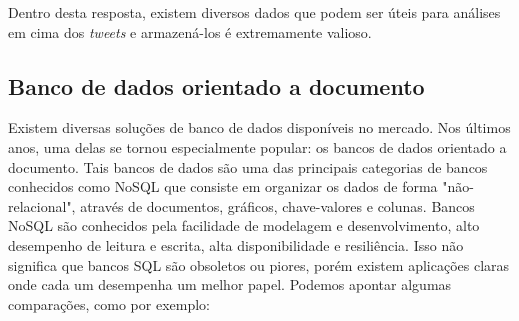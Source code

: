 Dentro desta resposta, existem diversos dados que podem ser úteis para análises em cima dos \textit{tweets} e armazená-los é extremamente valioso.

\subsection{Banco de dados orientado a documento}

Existem diversas soluções de banco de dados disponíveis no mercado. Nos últimos anos, uma delas se tornou especialmente popular\cite{bhuvan2015technical}: os bancos de dados orientado a documento. Tais bancos de dados são uma das principais categorias de bancos conhecidos como \ac{NoSQL} que consiste em organizar os dados de forma "não-relacional", através de documentos, gráficos, chave-valores e colunas. Bancos NoSQL são conhecidos pela facilidade de modelagem e desenvolvimento, alto desempenho de leitura e escrita, alta disponibilidade e resiliência. Isso não significa que bancos \ac{SQL} são obsoletos ou piores, porém existem aplicações claras onde cada um desempenha um melhor papel. Podemos apontar algumas comparações, como por exemplo:

